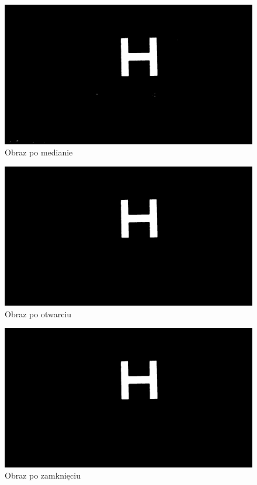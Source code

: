 \begin{figure}[h]
	\centering
	\includegraphics[width=\textwidth]{median.jpg}
	\caption{Obraz po medianie}
	\label{fig:median}
\end{figure}
\begin{figure}[h]
	\centering
	\includegraphics[width=\textwidth]{opened.jpg}
	\caption{Obraz po otwarciu}
	\label{fig:opened}
\end{figure}
\begin{figure}[h]
	\centering
	\includegraphics[width=\textwidth]{closed.jpg}
	\caption{Obraz po zamknięciu}
	\label{fig:closed}
\end{figure}
